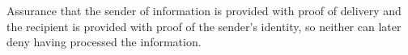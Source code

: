 Assurance that the sender of information is provided with proof of delivery and the recipient is provided with proof of the sender's identity, so neither can later deny having processed the information.